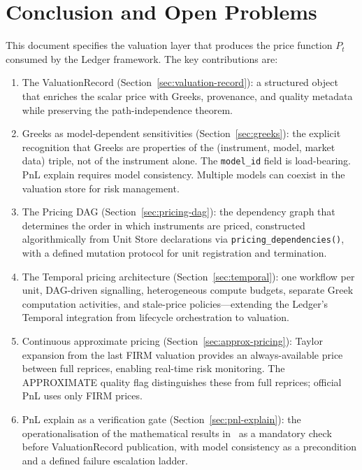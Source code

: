 \documentclass[11pt,a4paper]{article}
\begin{document}
\clearpage
\section{Conclusion and Open Problems}
\label{sec:conclusion}

This document specifies the valuation layer that produces the price function $P_t$ consumed by the Ledger framework.  The key contributions are:

\begin{enumerate}
\item The ValuationRecord (Section~\ref{sec:valuation-record}): a structured object that enriches the scalar price with Greeks, provenance, and quality metadata while preserving the path-independence theorem.

\item Greeks as model-dependent sensitivities (Section~\ref{sec:greeks}): the explicit recognition that Greeks are properties of the (instrument, model, market data) triple, not of the instrument alone.  The \texttt{model\_id} field is load-bearing.  PnL explain requires model consistency.  Multiple models can coexist in the valuation store for risk management.

\item The Pricing DAG (Section~\ref{sec:pricing-dag}): the dependency graph that determines the order in which instruments are priced, constructed algorithmically from Unit Store declarations via \texttt{pricing\_dependencies()}, with a defined mutation protocol for unit registration and termination.

\item The Temporal pricing architecture (Section~\ref{sec:temporal}): one workflow per unit, DAG-driven signalling, heterogeneous compute budgets, separate Greek computation activities, and stale-price policies---extending the Ledger's Temporal integration from lifecycle orchestration to valuation.

\item Continuous approximate pricing (Section~\ref{sec:approx-pricing}): Taylor expansion from the last FIRM valuation provides an always-available price between full reprices, enabling real-time risk monitoring.  The APPROXIMATE quality flag distinguishes these from full reprices; official PnL uses only FIRM prices.

\item PnL explain as a verification gate (Section~\ref{sec:pnl-explain}): the operationalisation of the mathematical results in~\cite{pnl_explain} as a mandatory check before ValuationRecord publication, with model consistency as a precondition and a defined failure escalation ladder.


\end{enumerate}
\end{document}
